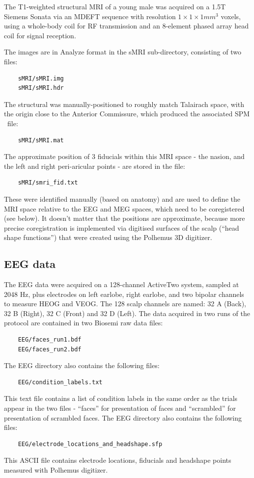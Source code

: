 The T1-weighted structural MRI of a young male was acquired on a 1.5T Siemens Sonata via an MDEFT sequence with resolution $1 \times 1 \times 1 mm^3$ voxels, using a whole-body coil for RF transmission and an 8-element phased array head coil for signal reception.

The images are in Analyze format in the sMRI sub-directory, consisting of two files:
\begin{verbatim}
    sMRI/sMRI.img
    sMRI/sMRI.hdr
\end{verbatim}
The structural was manually-positioned to roughly match Talairach space, with the origin close to the Anterior Commissure, which produced the associated SPM \matlab\ file:
\begin{verbatim}
    sMRI/sMRI.mat
\end{verbatim}
The approximate position of 3 fiducials within this MRI space - the nasion, and the left and right peri-aricular points - are stored in the file:
\begin{verbatim}
    sMRI/smri_fid.txt
\end{verbatim}
These were identified manually (based on anatomy) and are used to define the MRI space relative to the EEG and MEG spaces, which need to be coregistered (see below). It doesn't matter that the positions are approximate, because more precise coregistration is implemented via digitised surfaces of the scalp (``head shape functions'') that were created using the Polhemus 3D digitizer.

\subsection{EEG data}

The EEG data were acquired on a 128-channel ActiveTwo system, sampled at 2048 Hz, plus electrodes on left earlobe, right earlobe, and two bipolar channels to measure HEOG and VEOG. The 128 scalp channels are named: 32 A (Back), 32 B (Right), 32 C (Front) and 32 D (Left). The data acquired in two runs of the protocol are contained in two Biosemi raw data files:
\begin{verbatim}
    EEG/faces_run1.bdf
    EEG/faces_run2.bdf
\end{verbatim}

The EEG directory also contains the following files:
\begin{verbatim}
    EEG/condition_labels.txt
\end{verbatim}
This text file contains a list of condition labels in the same order as the trials appear in the two files - ``faces'' for presentation of faces and ``scrambled'' for presentation of scrambled faces.
The EEG directory also contains the following files:
\begin{verbatim}
    EEG/electrode_locations_and_headshape.sfp
\end{verbatim}
This ASCII file contains electrode locations, fiducials and headshape points measured with Polhemus digitizer.

